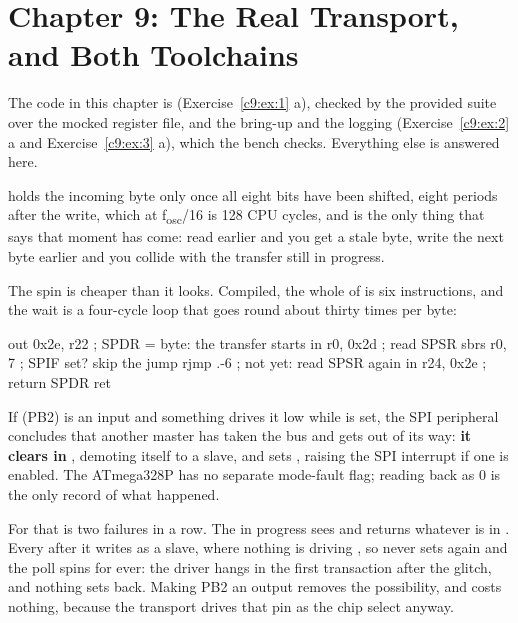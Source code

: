 
\section{Chapter 9: The Real Transport, and Both Toolchains}
\label{sol:c9}
The code in this chapter is  (Exercise~\ref{c9:ex:1} a), checked by the provided
suite  over the mocked register file, and the bring-up
 and the logging (Exercise~\ref{c9:ex:2} a and Exercise~\ref{c9:ex:3} a), which the
bench checks. Everything else is answered here.

  holds the incoming byte only once all eight bits have been shifted, eight
 periods after the write, which at f\textsubscript{osc}/16 is 128 CPU cycles, and
 is the only thing that says that moment has come: read earlier and you get a stale
byte, write the next byte earlier and you collide with the transfer still in progress.

The spin is cheaper than it looks. Compiled, the whole of  is six instructions,
and the wait is a four-cycle loop that goes round about thirty times per byte:

\begin{console}
out  0x2e, r22      ; SPDR = byte: the transfer starts
in   r0, 0x2d       ; read SPSR
sbrs r0, 7          ; SPIF set? skip the jump
rjmp .-6            ; not yet: read SPSR again
in   r24, 0x2e      ; return SPDR
ret
\end{console}

 If  (PB2) is an input and something drives it low while  is set, the
SPI peripheral concludes that another master has taken the bus and gets out of its way:
\textbf{it clears  in }, demoting itself to a slave, and sets ,
raising the SPI interrupt if one is enabled. The ATmega328P has no separate mode-fault flag;
 reading back as 0 is the only record of what happened.

For  that is two failures in a row. The  in progress sees 
and returns whatever is in . Every  after it writes  as a
slave, where nothing is driving , so  never sets again and the poll spins for
ever: the driver hangs in the first transaction after the glitch, and nothing sets  back.
Making PB2 an output removes the possibility, and costs nothing, because the transport drives that
pin as the chip select anyway.

